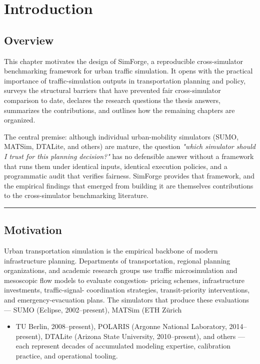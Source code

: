 \chapter{Introduction}\label{chapter-1-introduction}

\section{Overview}\label{10-overview}

This chapter motivates the design of SimForge, a reproducible
cross-simulator benchmarking framework for urban traffic simulation. It
opens with the practical importance of traffic-simulation outputs in
transportation planning and policy, surveys the structural barriers that
have prevented fair cross-simulator comparison to date, declares the
research questions the thesis answers, summarizes the contributions, and
outlines how the remaining chapters are organized.

The central premise: although individual urban-mobility simulators
(SUMO, MATSim, DTALite, and others) are mature, the question
\emph{"which simulator should I trust for this planning decision?"} has
no defensible answer without a framework that runs them under identical
inputs, identical execution policies, and a programmatic audit that
verifies fairness. SimForge provides that framework, and the empirical
findings that emerged from building it are themselves contributions to
the cross-simulator benchmarking literature.

\begin{center}\rule{0.5\linewidth}{0.5pt}\end{center}

\section{Motivation}\label{11-motivation}

Urban transportation simulation is the empirical backbone of modern
infrastructure planning. Departments of transportation, regional
planning organizations, and academic research groups use traffic
microsimulation and mesoscopic flow models to evaluate congestion-
pricing schemes, infrastructure investments, traffic-signal-
coordination strategies, transit-priority interventions, and
emergency-evacuation plans. The simulators that produce these
evaluations --- SUMO (Eclipse, 2002--present), MATSim (ETH Zürich

\begin{itemize}
\tightlist
\item
  TU Berlin, 2008--present), POLARIS (Argonne National Laboratory,
  2014--present), DTALite (Arizona State University, 2010--present), and
  others --- each represent decades of accumulated modeling expertise,
  calibration practice, and operational tooling.
\end{itemize}


